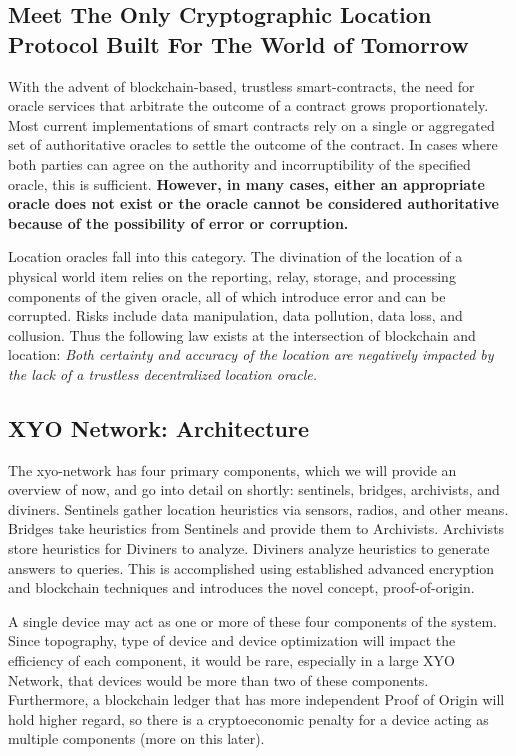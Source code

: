 \documentclass{article}
\begin{document}
\subsection {Meet The Only Cryptographic Location Protocol Built For The World of Tomorrow}
With the advent of blockchain-based, trustless \glspl{smart-contract}, the need for \gls{oracle} services that arbitrate the outcome of a contract grows proportionately. Most current implementations of smart contracts rely on a single or aggregated set of authoritative oracles to settle the outcome of the contract. In cases where both parties can agree on the authority and incorruptibility of the specified oracle, this is sufficient. \textbf{However, in many cases, either an appropriate oracle does not exist or the oracle cannot be considered authoritative because of the possibility of error or corruption.}

Location oracles fall into this category. The divination of the location of a physical world item relies on the reporting, relay, storage, and processing components of the given oracle, all of which introduce error and can be corrupted. Risks include data manipulation, data pollution, data loss, and collusion. Thus the following law exists at the intersection of blockchain and location: \textit{Both \gls{certainty} and \gls{accuracy} of the location are negatively impacted by the lack of a trustless decentralized location oracle.}

\subsection {XYO Network: Architecture}
The \Gls{xyo-network} has four primary components, which we will provide an overview of now, and go into detail on shortly: \Glspl{sentinel}, \Glspl{bridge}, \Glspl{archivist}, and \Glspl{diviner}. Sentinels gather location \glspl{heuristic} via sensors, radios, and other means. Bridges take heuristics from Sentinels and provide them to Archivists. Archivists store heuristics for Diviners to analyze. Diviners analyze heuristics to generate answers to queries. This is accomplished using established advanced encryption and blockchain techniques and introduces the novel concept, \Gls{proof-of-origin}.

A single device may act as one or more of these four components of the system. Since topography, type of device and device optimization will impact the efficiency of each component, it would be rare, especially in a large XYO Network, that devices would be more than two of these components. Furthermore, a blockchain ledger that has more independent Proof of Origin will hold higher regard, so there is a cryptoeconomic penalty for a device acting as multiple components (more on this later).
\end{document}
